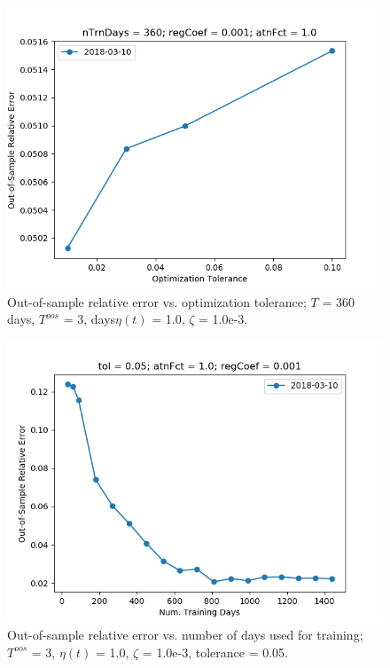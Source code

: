 \documentclass{article}
\begin{document}
\begin{figure}
\includegraphics[scale=0.9,bb=0 0 640 480]{figures/tolerance-sensitivity-oos-error.png}
\caption{Out-of-sample relative error vs. optimization tolerance; $T$
  = 360 days, $T^{oos}$ = 3, days$\eta(t)$ = 1.0, $\zeta$ = 1.0e-3.}
\label{fig:tolerance-sensitivity-oos-error}
\end{figure}

\begin{figure}
\includegraphics[scale=0.9,bb=0 0 640 480]{figures/nTrnDays-sensitivity-oos-error.png}
\caption{Out-of-sample relative error vs. number of days used for
  training; $T^{oos}$ = 3, $\eta(t)$ = 1.0, $\zeta$ = 1.0e-3,
  tolerance = 0.05.}
\label{fig:nTrnDays-sensitivity-oos-error}
\end{figure}
\end{document}
